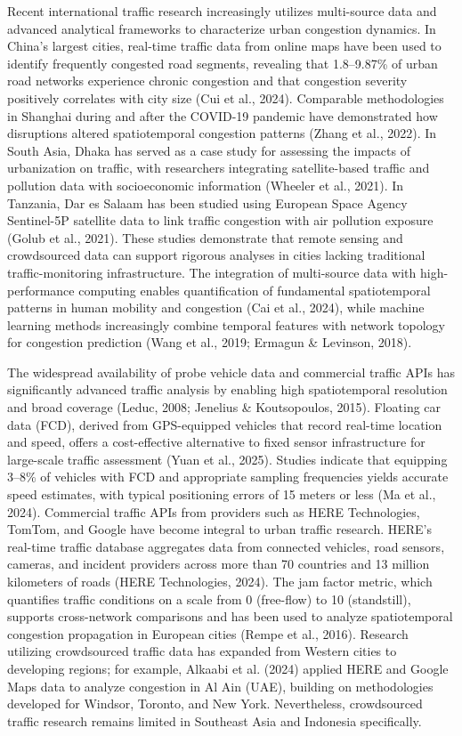 \documentclass[12pt,a4paper]{article}
\begin{document}
Recent international traffic research increasingly utilizes multi-source data and advanced analytical frameworks to characterize urban congestion dynamics. In China's largest cities, real-time traffic data from online maps have been used to identify frequently congested road segments, revealing that 1.8--9.87\% of urban road networks experience chronic congestion and that congestion severity positively correlates with city size (Cui et al., 2024). Comparable methodologies in Shanghai during and after the COVID-19 pandemic have demonstrated how disruptions altered spatiotemporal congestion patterns (Zhang et al., 2022). In South Asia, Dhaka has served as a case study for assessing the impacts of urbanization on traffic, with researchers integrating satellite-based traffic and pollution data with socioeconomic information (Wheeler et al., 2021). In Tanzania, Dar es Salaam has been studied using European Space Agency Sentinel-5P satellite data to link traffic congestion with air pollution exposure (Golub et al., 2021). These studies demonstrate that remote sensing and crowdsourced data can support rigorous analyses in cities lacking traditional traffic-monitoring infrastructure. The integration of multi-source data with high-performance computing enables quantification of fundamental spatiotemporal patterns in human mobility and congestion (Cai et al., 2024), while machine learning methods increasingly combine temporal features with network topology for congestion prediction (Wang et al., 2019; Ermagun \& Levinson, 2018).

The widespread availability of probe vehicle data and commercial traffic APIs has significantly advanced traffic analysis by enabling high spatiotemporal resolution and broad coverage (Leduc, 2008; Jenelius \& Koutsopoulos, 2015). Floating car data (FCD), derived from GPS-equipped vehicles that record real-time location and speed, offers a cost-effective alternative to fixed sensor infrastructure for large-scale traffic assessment (Yuan et al., 2025). Studies indicate that equipping 3--8\% of vehicles with FCD and appropriate sampling frequencies yields accurate speed estimates, with typical positioning errors of 15 meters or less (Ma et al., 2024). Commercial traffic APIs from providers such as HERE Technologies, TomTom, and Google have become integral to urban traffic research. HERE's real-time traffic database aggregates data from connected vehicles, road sensors, cameras, and incident providers across more than 70 countries and 13 million kilometers of roads (HERE Technologies, 2024). The jam factor metric, which quantifies traffic conditions on a scale from 0 (free-flow) to 10 (standstill), supports cross-network comparisons and has been used to analyze spatiotemporal congestion propagation in European cities (Rempe et al., 2016). Research utilizing crowdsourced traffic data has expanded from Western cities to developing regions; for example, Alkaabi et al. (2024) applied HERE and Google Maps data to analyze congestion in Al Ain (UAE), building on methodologies developed for Windsor, Toronto, and New York. Nevertheless, crowdsourced traffic research remains limited in Southeast Asia and Indonesia specifically.
\end{document}
